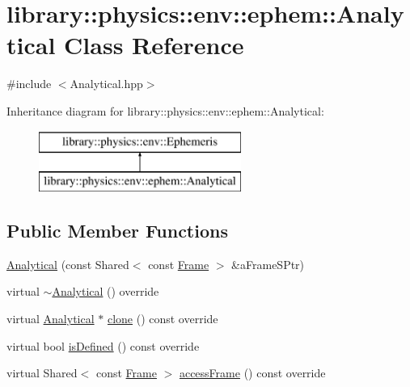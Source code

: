 \hypertarget{classlibrary_1_1physics_1_1env_1_1ephem_1_1_analytical}{}\section{library\+:\+:physics\+:\+:env\+:\+:ephem\+:\+:Analytical Class Reference}
\label{classlibrary_1_1physics_1_1env_1_1ephem_1_1_analytical}


{\ttfamily \#include $<$Analytical.\+hpp$>$}

Inheritance diagram for library\+:\+:physics\+:\+:env\+:\+:ephem\+:\+:Analytical\+:\begin{figure}[H]
\begin{center}
\leavevmode
\includegraphics[height=2.000000cm]{classlibrary_1_1physics_1_1env_1_1ephem_1_1_analytical}
\end{center}
\end{figure}
\subsection*{Public Member Functions}
\begin{DoxyCompactItemize}
\item 
\hyperlink{classlibrary_1_1physics_1_1env_1_1ephem_1_1_analytical_a3282f9dfc8fbe95f4b8a7a89141ca60e}{Analytical} (const Shared$<$ const \hyperlink{classlibrary_1_1physics_1_1coord_1_1_frame}{Frame} $>$ \&a\+Frame\+S\+Ptr)
\item 
virtual \hyperlink{classlibrary_1_1physics_1_1env_1_1ephem_1_1_analytical_a0219af2c16308c2e7d39e40ba57fa11e}{$\sim$\+Analytical} () override
\item 
virtual \hyperlink{classlibrary_1_1physics_1_1env_1_1ephem_1_1_analytical}{Analytical} $\ast$ \hyperlink{classlibrary_1_1physics_1_1env_1_1ephem_1_1_analytical_acd51ca99177b1433b6623829ae003bec}{clone} () const override
\item 
virtual bool \hyperlink{classlibrary_1_1physics_1_1env_1_1ephem_1_1_analytical_a0c0fe5d8326ba439bb0b51e7536ab0fd}{is\+Defined} () const override
\item 
virtual Shared$<$ const \hyperlink{classlibrary_1_1physics_1_1coord_1_1_frame}{Frame} $>$ \hyperlink{classlibrary_1_1physics_1_1env_1_1ephem_1_1_analytical_ad16f575a7804bd29710030289d5630b1}{access\+Frame} () const override
\end{DoxyCompactItemize}


